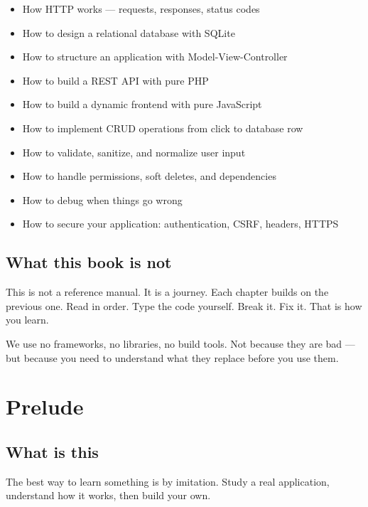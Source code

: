\documentclass[11pt,a4paper,oneside]{book}
\providecommand{\tightlist}{%
  \setlength{\itemsep}{0pt}\setlength{\parskip}{0pt}}
\begin{document}
\begin{itemize}
\tightlist
\item
  How HTTP works --- requests, responses, status codes
\item
  How to design a relational database with SQLite
\item
  How to structure an application with Model-View-Controller
\item
  How to build a REST API with pure PHP
\item
  How to build a dynamic frontend with pure JavaScript
\item
  How to implement CRUD operations from click to database row
\item
  How to validate, sanitize, and normalize user input
\item
  How to handle permissions, soft deletes, and dependencies
\item
  How to debug when things go wrong
\item
  How to secure your application: authentication, CSRF, headers,
  HTTPS
\end{itemize}

\hypertarget{what-this-book-is-not}{%
\section*{What this book is not}\label{what-this-book-is-not}}

This is not a reference manual. It is a journey. Each chapter
builds on the previous one. Read in order. Type the code
yourself. Break it. Fix it. That is how you learn.

We use no frameworks, no libraries, no build tools. Not because
they are bad --- but because you need to understand what they
replace before you use them.

\newpage

\hypertarget{prelude}{%
\chapter{Prelude}\label{prelude}}

\hypertarget{what-is-this}{%
\section{What is this}\label{what-is-this}}

The best way to learn something is by imitation. Study a real
application, understand how it works, then build your own.
\end{document}
